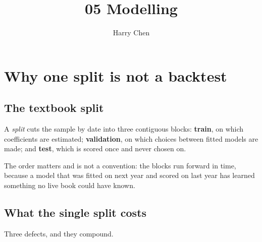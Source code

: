 
\title{05 \midot{} Modelling}
\author{Harry Chen}
\date{}
\maketitle

\tableofcontents
\newpage


\section{Why one split is not a backtest}\label{sec:one-split}

\subsection{The textbook split}\label{sec:textbook-split}

\begin{definition}[Split]\label{def:split}
A \emph{split} cuts the sample by date into three contiguous blocks: \textbf{train}, on which
coefficients are estimated; \textbf{validation}, on which choices between fitted models are made;
and \textbf{test}, which is scored once and never chosen on.
\end{definition}


The order matters and is not a convention: the blocks run forward in time, because a model that
was fitted on next year and scored on last year has learned something no live book could have
known.

\subsection{What the single split costs}\label{sec:split-costs}

Three defects, and they compound.

